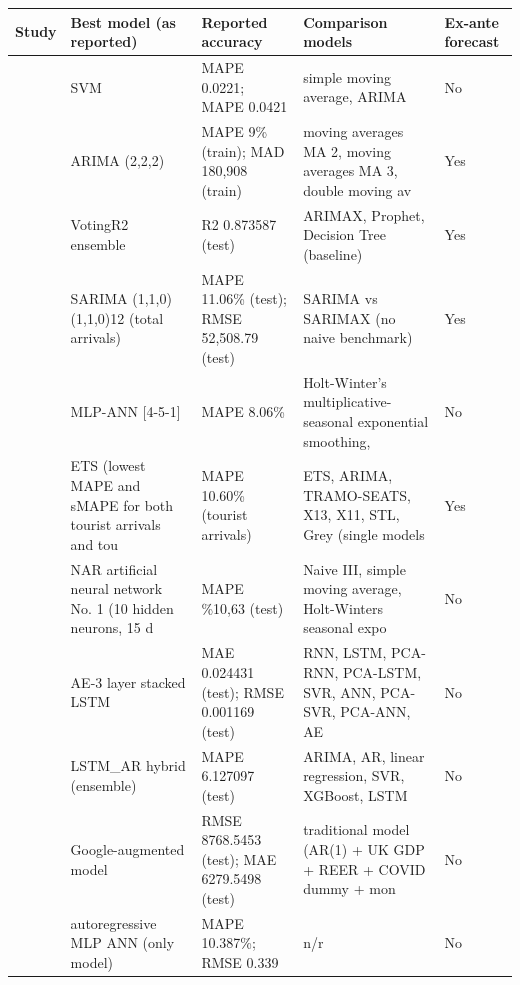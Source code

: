 \begin{tabular}{@{}p{3.2cm}p{4.2cm}p{4.6cm}p{5.0cm}p{1.6cm}@{}}
\toprule
Study & Best model (as reported) & Reported accuracy & Comparison models & Ex-ante forecast\\
\midrule
\citet{AlShehhi2018} & SVM & MAPE 0.0221; MAPE 0.0421 & simple moving average, ARIMA & No \\
\citet{Alamoudi2020} & ARIMA (2,2,2) & MAPE 9\% (train); MAD 180,908 (train) & moving averages MA 2, moving averages MA 3, double moving av & Yes \\
\citet{Alsulami2026} & VotingR2 ensemble & R2 0.873587 (test) & ARIMAX, Prophet, Decision Tree (baseline) & Yes \\
\citet{Bilek2025} & SARIMA (1,1,0)(1,1,0)12 (total arrivals) & MAPE 11.06\% (test); RMSE 52,508.79 (test) & SARIMA vs SARIMAX (no naive benchmark) & Yes \\
\citet{Cuhadar2020} & MLP-ANN [4-5-1] & MAPE 8.06\% & Holt-Winter's multiplicative-seasonal exponential smoothing, & No \\
\citet{Kayral2023} & ETS (lowest MAPE and sMAPE for both tourist arrivals and tou & MAPE 10.60\% (tourist arrivals) & ETS, ARIMA, TRAMO-SEATS, X13, X11, STL, Grey (single models  & Yes \\
\citet{Kurtulay2024} & NAR artificial neural network No. 1 (10 hidden neurons, 15 d & MAPE \%10,63 (test) & Naive III, simple moving average, Holt-Winters seasonal expo & No \\
\citet{Laaroussi2023} & AE-3 layer stacked LSTM & MAE 0.024431 (test); RMSE 0.001169 (test) & RNN, LSTM, PCA-RNN, PCA-LSTM, SVR, ANN, PCA-SVR, PCA-ANN, AE & No \\
\citet{Ouassou2022} & LSTM\_AR hybrid (ensemble) & MAPE 6.127097 (test) & ARIMA, AR, linear regression, SVR, XGBoost, LSTM & No \\
\citet{Rashad2022} & Google-augmented model & RMSE 8768.5453 (test); MAE 6279.5498 (test) & traditional model (AR(1) + UK GDP + REER + COVID dummy + mon & No \\
\citet{Tuncsiper2023} & autoregressive MLP ANN (only model) & MAPE 10.387\%; RMSE 0.339 & n/r & No \\
\bottomrule
\end{tabular}
